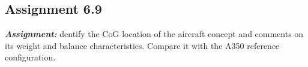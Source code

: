 \documentclass{article}
\begin{document}
\clearpage

\subsection{Assignment 6.9\label{Assignment_6.9}}

\textbf{\textit{Assignment:}} dentify the CoG location of the aircraft concept and comments
on its weight and balance characteristics. 
Compare it with the A350 reference configuration. \\ \\ \\ 

\clearpage




\pagebreak
\printbibliography
    
\end{document}
